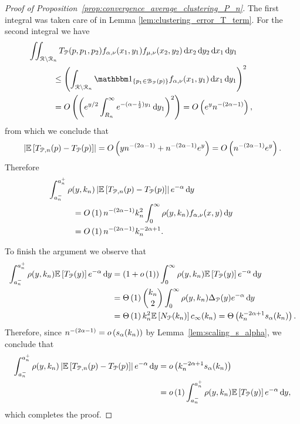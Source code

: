 \begin{proof}[Proof of Proposition~\ref{prop:convergence_average_clustering_P_n}]
The first integral was taken care of in Lemma \ref{lem:clustering_error_T_term}. For the second integral we have
\begin{align*}
	&\hspace{-30pt}\iint_{\Rcal \setminus \Rcal_n} T_{\Pcal}(p,p_1,p_2) f_{\alpha, \nu}(x_1,y_1) f_{\mu, \nu}(x_2,y_2)
		\dd x_2 \dd y_2 \dd x_1 \dd y_1\\
	&\le \left(\int_{\Rcal \setminus \Rcal_n} \ind{p_1 \in \BallPo{p}} f_{\alpha, \nu}(x_1,y_1) \dd x_1 \dd y_1\right)^2\\
	&= \bigO{\left(e^{y/2} \int_{R_n}^\infty e^{-(\alpha - \frac{1}{2})y_1} \dd y_1\right)^2}
		= \bigO{e^y n^{-(2\alpha - 1)}},
\end{align*}
from which we conclude that
\[
	\left|\mathbb{E}\left[T_{{\mathcal P},n}(p) - T_{{\mathcal P}}(p)\right]\right| = O\left(y n^{-(2\alpha - 1)} + n^{-(2\alpha-1)} e^{y}\right)
	= O\left(n^{-(2\alpha-1)} e^{y}\right).
\]
Therefore 
\begin{align*}
	&\hspace{-30pt}\int_{a_n^-}^{a_n^+} \rho(y,k_n) \left|\Exp{T_{\Pcal,n}(p) - T_{\Pcal}(p)}\right| 
		e^{-\alpha} \dd y\\
	&= \bigO{1} n^{-(2\alpha - 1)} k_n^2 \int_{0}^\infty \rho(y,k_n) f_{\alpha,\nu}(x,y) \dd y\\
	&= \bigO{1} n^{-(2\alpha - 1)} k_n^{-2\alpha + 1}.
\end{align*}

To finish the argument we observe that
\begin{align*}
	\int_{a_n^-}^{a_n^+} \rho(y,k_n) \mathbb{E}\left[T_{{\mathcal P}}(y)\right] e^{-\alpha} \operatorname{\mathrm{d}\hspace{-2pt}} y 
	&= (1 + o\left(1\right))\int_0^\infty \rho(y,k_n) \mathbb{E}\left[T_{{\mathcal P}}(y)\right] e^{-\alpha} \operatorname{\mathrm{d}\hspace{-2pt}} y \\
	&= \Theta\left(1\right) \binom{k_n}{2} \int_0^\infty \rho(y,k_n) \Delta_{{\mathcal P}}(y) e^{-\alpha} \operatorname{\mathrm{d}\hspace{-2pt}} y\\
	&= \Theta\left(1\right) k_n^{2} \mathbb{E}\left[N_{{\mathcal P}}(k_n)\right] c_\infty(k_n)
		= \Theta\left(k_n^{-2\alpha + 1} s_\alpha(k_n)\right).
\end{align*}
Therefore, since $n^{-(2\alpha - 1)} = o\left(s_\alpha(k_n)\right)$ by Lemma~\ref{lem:scaling_s_alpha}, we conclude that
\begin{align*}
	\int_{a_n^-}^{a_n^+} \rho(y,k_n) \left|\mathbb{E}\left[T_{{\mathcal P},n}(p) - T_{{\mathcal P}}(p)\right]\right| e^{-\alpha} \operatorname{\mathrm{d}\hspace{-2pt}} y 
	&= o\left(k_n^{-2\alpha + 1} s_\alpha(k_n)\right) \\
	&= o\left(1\right) \int_{a_n^-}^{a_n^+} \rho(y,k_n) \mathbb{E}\left[T_{{\mathcal P}}(y)\right] e^{-\alpha} \operatorname{\mathrm{d}\hspace{-2pt}} y,
\end{align*}
which completes the proof.

\end{proof}


